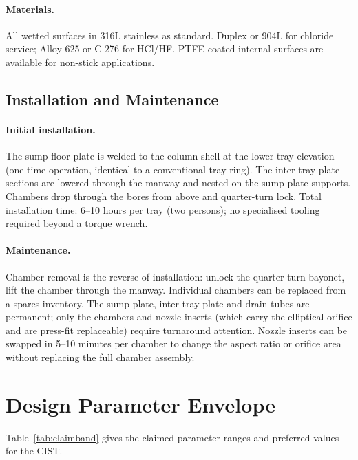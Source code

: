 \documentclass[11pt,letterpaper]{article}
\begin{document}
\paragraph{Materials.}
All wetted surfaces in 316L stainless as standard.  Duplex or 904L for
chloride service; Alloy 625 or C-276 for HCl/HF.  PTFE-coated internal
surfaces are available for non-stick applications.

\subsection{Installation and Maintenance}
\label{sec:installation}

\paragraph{Initial installation.}
The sump floor plate is welded to the column shell at the lower tray
elevation (one-time operation, identical to a conventional tray ring).  The
inter-tray plate sections are lowered through the manway and nested on the
sump plate supports.  Chambers drop through the bores from above and
quarter-turn lock.  Total installation time: 6--10 hours per tray (two
persons); no specialised tooling required beyond a torque wrench.

\paragraph{Maintenance.}
Chamber removal is the reverse of installation: unlock the quarter-turn
bayonet, lift the chamber through the manway.  Individual chambers can be
replaced from a spares inventory.  The sump plate, inter-tray plate and
drain tubes are permanent; only the chambers and nozzle inserts (which
carry the elliptical orifice and are press-fit replaceable) require
turnaround attention.  Nozzle inserts can be swapped in 5--10 minutes per
chamber to change the aspect ratio or orifice area without replacing the
full chamber assembly.

\section{Design Parameter Envelope}
\label{sec:parameters}

Table~\ref{tab:claimband} gives the claimed parameter ranges and preferred
values for the CIST.
\end{document}
